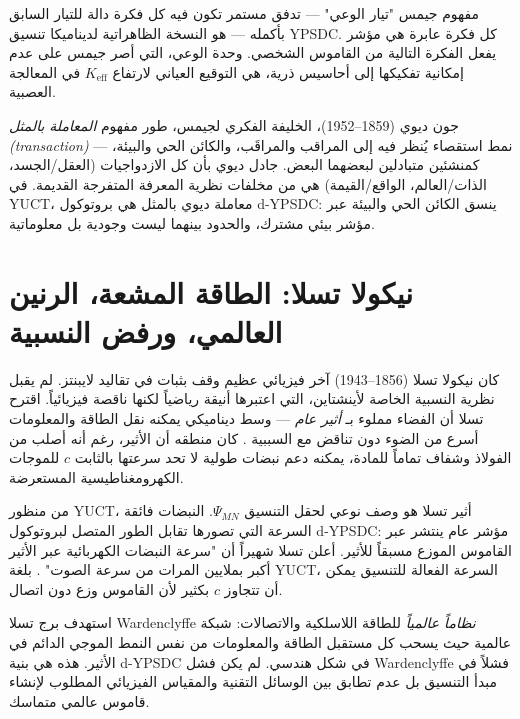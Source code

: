 \documentclass[12pt,a4paper]{article}
\begin{document}
	مفهوم جيمس "تيار الوعي" — تدفق مستمر تكون فيه كل فكرة دالة للتيار السابق بأكمله — هو النسخة الظاهراتية لديناميكا تنسيق YPSDC. كل فكرة عابرة هي مؤشر يفعل الفكرة التالية من القاموس الشخصي. وحدة الوعي، التي أصر جيمس على عدم إمكانية تفكيكها إلى أحاسيس ذرية، هي التوقيع العياني لارتفاع \(K_{\mathrm{eff}}\) في المعالجة العصبية.
	
	جون ديوي (1859–1952)، الخليفة الفكري لجيمس، طور مفهوم \emph{المعاملة بالمثل (transaction)} — نمط استقصاء يُنظر فيه إلى المراقب والمراقَب، والكائن الحي والبيئة، كمنشئين متبادلين لبعضهما البعض. جادل ديوي بأن كل الازدواجيات (العقل/الجسد، الذات/العالم، الواقع/القيمة) هي من مخلفات نظرية المعرفة المتفرجة القديمة. في YUCT، معاملة ديوي بالمثل هي بروتوكول d-YPSDC: ينسق الكائن الحي والبيئة عبر مؤشر بيئي مشترك، والحدود بينهما ليست وجودية بل معلوماتية.
	
	\section{نيكولا تسلا: الطاقة المشعة، الرنين العالمي، ورفض النسبية}
	
	كان نيكولا تسلا (1856–1943) آخر فيزيائي عظيم وقف بثبات في تقاليد لايبنتز. لم يقبل نظرية النسبية الخاصة لأينشتاين، التي اعتبرها أنيقة رياضياً لكنها ناقصة فيزيائياً. اقترح تسلا أن الفضاء مملوء بـ \emph{أثير عام} — وسط ديناميكي يمكنه نقل الطاقة والمعلومات أسرع من الضوء دون تناقض مع السببية \cite{Tesla1932}. كان منطقه أن الأثير، رغم أنه أصلب من الفولاذ وشفاف تماماً للمادة، يمكنه دعم نبضات طولية لا تحد سرعتها بالثابت \(c\) للموجات الكهرومغناطيسية المستعرضة.
	
	من منظور YUCT، أثير تسلا هو وصف نوعي لحقل التنسيق \(\Psi_{MN}\). النبضات فائقة السرعة التي تصورها تقابل الطور المتصل لبروتوكول d-YPSDC: مؤشر عام ينتشر عبر القاموس الموزع مسبقاً للأثير. أعلن تسلا شهيراً أن "سرعة النبضات الكهربائية عبر الأثير أكبر بملايين المرات من سرعة الصوت" \cite{Tesla1907}. بلغة YUCT، السرعة الفعالة للتنسيق يمكن أن تتجاوز \(c\) بكثير لأن القاموس وزع دون اتصال.
	
	استهدف برج تسلا Wardenclyffe \emph{نظاماً عالمياً} للطاقة اللاسلكية والاتصالات: شبكة عالمية حيث يسحب كل مستقبل الطاقة والمعلومات من نفس النمط الموجي الدائم في الأثير. هذه هي بنية d-YPSDC في شكل هندسي. لم يكن فشل Wardenclyffe فشلاً في مبدأ التنسيق بل عدم تطابق بين الوسائل التقنية والمقياس الفيزيائي المطلوب لإنشاء قاموس عالمي متماسك.
	
\end{document}
